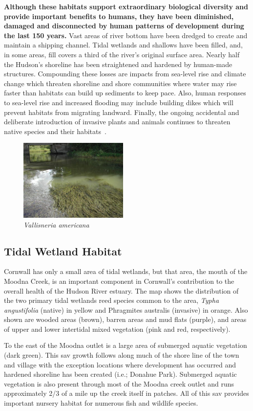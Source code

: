 \textbf{Although these habitats support extraordinary biological diversity and
provide important benefits to humans, they have been diminished, damaged and
disconnected by human patterns of development during the last 150 years.} Vast
areas of river bottom have been dredged to create and maintain a shipping
channel. Tidal wetlands and shallows have been filled, and, in some areas, fill
covers a third of the river's original surface area. Nearly half the Hudson's
shoreline has been straightened and hardened by human-made structures.
Compounding these losses are impacts from sea-level rise and climate change
which threaten shoreline and shore communities where water may rise faster than
habitats can build up sediments to keep pace. Also, human responses to
sea-level rise and increased flooding may include building dikes which will
prevent habitats from migrating landward. Finally, the ongoing accidental and
deliberate introduction of invasive plants and animals continues to threaten
native species and their habitats~\citep{nysdosmoodna, anderson2013}.

\begin{figure}
    \includegraphics[width=0.48\textwidth]{images/Water_Celery.jpg}
  \caption{\textit{Vallisneria americana}}
\end{figure}

\subsection*{Tidal Wetland Habitat}
Cornwall has only a small area of tidal wetlands, but that area, the mouth of
the Moodna Creek, is an important component in Cornwall’s contribution to the
overall health of the Hudson River estuary. The map shows the distribution of
the two primary tidal wetlands reed species common to the area, \textit{Typha
angustifolia} (native) in yellow and Phragmites australis (invasive) in orange.
Also shown are wooded areas (brown), barren areas and mud flats (purple), and
areas of upper and lower intertidal mixed vegetation (pink and red,
respectively).
\par
To the east of the Moodna outlet is a large area of submerged aquatic vegetation 
(dark green). This \gls{sav} growth follows along much of the shore line of the 
town and village with the exception locations where development has occurred and 
hardened shoreline has been created (i.e.; Donahue Park). Submerged aquatic 
vegetation is also present through most of the Moodna creek outlet and runs 
approximately 2/3 of a mile up the creek itself in patches. All of this 
\gls{sav} provides important nursery habitat for numerous fish and wildlife 
species.

